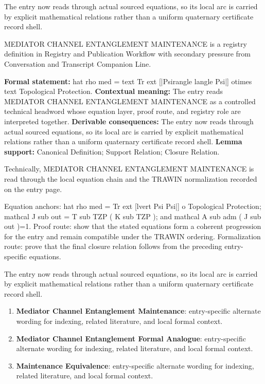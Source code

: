 The entry now reads through actual sourced equations, so its local arc is carried by explicit mathematical relations rather than a uniform quaternary certificate record shell.
\clearpage


\begingroup\small
{}
MEDIATOR CHANNEL ENTANGLEMENT MAINTENANCE is a registry definition in Registry and Publication Workflow with secondary pressure from Conversation and Transcript Companion Line.

\begingroup\footnotesize\setlength{\emergencystretch}{3em}\sloppy
\textbf{Formal statement:} hat rho med = text Tr ext [|Psirangle langle Psi|] otimes text Topological Protection. \textbf{Contextual meaning:} The entry reads MEDIATOR CHANNEL ENTANGLEMENT MAINTENANCE as a controlled technical headword whose equation layer, proof route, and registry role are interpreted together. \textbf{Derivable consequences:} The entry now reads through actual sourced equations, so its local arc is carried by explicit mathematical relations rather than a uniform quaternary certificate record shell. \textbf{Lemma support:} Canonical Definition; Support Relation; Closure Relation.\par
\endgroup

Technically, MEDIATOR CHANNEL ENTANGLEMENT MAINTENANCE is read through the local equation chain and the TRAWIN normalization recorded on the entry page.

Equation anchors: hat rho med = Tr ext [lvert Psi Psi|] o Topological Protection; mathcal J sub out = T sub TZP ( K sub TZP ); and mathcal A sub adm ( J sub out )=1. Proof route: show that the stated equations form a coherent progression for the entry and remain compatible under the TRAWIN ordering. Formalization route: prove that the final closure relation follows from the preceding entry-specific equations.

The entry now reads through actual sourced equations, so its local arc is carried by explicit mathematical relations rather than a uniform quaternary certificate record shell.
\endgroup

\begin{enumerate}[leftmargin=1.6em,itemsep=6pt,topsep=4pt]
\item \textbf{Mediator Channel Entanglement Maintenance}: entry-specific alternate wording for indexing, related literature, and local formal context.
\item \textbf{Mediator Channel Entanglement Formal Analogue}: entry-specific alternate wording for indexing, related literature, and local formal context.
\item \textbf{Maintenance Equivalence}: entry-specific alternate wording for indexing, related literature, and local formal context.
\end{enumerate}

